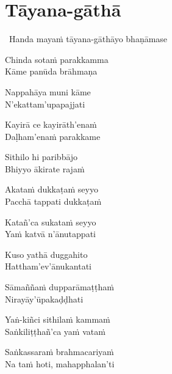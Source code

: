 \section{Tāyana-gāthā}
\label{tayana-gatha}

\begin{intro}
  \anglebracketleft\ \hspace{-0.5mm}Handa mayaṁ tāyana-gāthāyo bhaṇāmase \hspace{-0.5mm}\anglebracketright\
\end{intro}

\medskip

\begin{pali-hang}
Chinda sotaṁ parakkamma\\
Kāme panūda brāhmaṇa
\end{pali-hang}
\begin{pali-hang}
Nappahāya muni kāme\\
N'ekattam'upapajjati
\end{pali-hang}
\begin{pali-hang}
Kayirā ce kayirāth'enaṁ\\
Daḷham'enaṁ parakkame
\end{pali-hang}
\begin{pali-hang}
Sithilo hi paribbājo\\
Bhiyyo ākirate rajaṁ
\end{pali-hang}
\begin{pali-hang}
Akataṁ dukkaṭaṁ seyyo\\
Pacchā tappati dukkaṭaṁ
\end{pali-hang}
\begin{pali-hang}
Katañ'ca sukataṁ seyyo\\
Yaṁ katvā n'ānutappati
\end{pali-hang}
\begin{pali-hang}
Kuso yathā duggahito\\
Hattham'ev'ānukantati
\end{pali-hang}
\begin{pali-hang}
Sāmaññaṁ dupparāmaṭṭhaṁ\\
Nirayāy'ūpakaḍḍhati
\end{pali-hang}
\begin{pali-hang}
Yaṅ-kiñci sithilaṁ kammaṁ\\
Saṅkiliṭṭhañ'ca yaṁ vataṁ
\end{pali-hang}
\begin{pali-hang}
Saṅkassaraṁ brahmacariyaṁ\\
Na taṁ hoti, mahapphalan'ti
\end{pali-hang}

\clearpage
